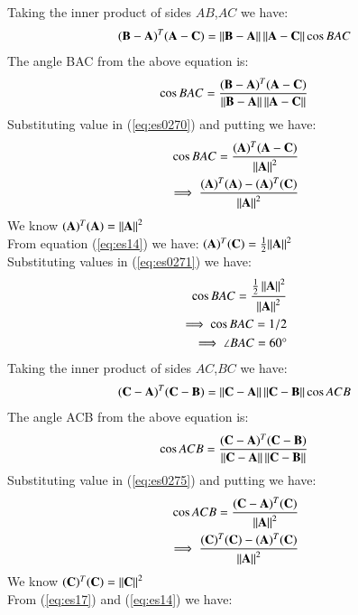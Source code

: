 \documentclass[journal,12pt,twocolumn]{IEEEtran}
\begin{document}
Taking the inner product of sides $AB$,$AC$ we have:
\begin{align}
    (\mathbf{B}-\mathbf{A})^T(\mathbf{A}-\mathbf{C}) =
    \left\lVert\mathbf{B}-\mathbf{A}\right\rVert\left\lVert\mathbf{A}-\mathbf{C}\right\rVert\cos{BAC}
\end{align}
The angle BAC from the  above equation is:
\begin{align}\label{eq:es0270}
     \cos{BAC} = \frac{(\mathbf{B}-\mathbf{A})^T(\mathbf{A}-\mathbf{C})}{\left\lVert\mathbf{B}-\mathbf{A}\right\rVert\left\lVert\mathbf{A}-\mathbf{C}\right\rVert} 
\end{align}
Substituting value in (\ref{eq:es0270}) and putting we have:
\begin{align}\label{eq:es0271}
     \cos{BAC} = \frac{(\mathbf{A})^T(\mathbf{A-C})}{\left\lVert\mathbf{A}\right\rVert^2}\\
     \implies \frac{(\mathbf{A})^T(\mathbf{A})-(\mathbf{A})^T(\mathbf{C})}{\left\lVert\mathbf{A}\right\rVert^2}
\end{align}
We know $(\mathbf{A})^T (\mathbf{A})= {\left\lVert\mathbf{A}\right\rVert^2}$\\
From  equation (\ref{eq:es14}) we have:
$ (\mathbf{A})^T(\mathbf{C})= \frac{1}{2}{\left\lVert\mathbf{A}\right\rVert^2}$\\
Substituting values in (\ref{eq:es0271}) we have:
\begin{align}\label{eq:es0272}
\cos{BAC} =
    \frac{{\frac{1}{2}\left\lVert\mathbf{A}\right\rVert^2}}{\left\lVert\mathbf{A}\right\rVert^2}\nonumber\\
     \implies \cos{BAC} = 1/2\nonumber\\
\implies \angle {BAC =60 \degree}
\end{align}
Taking the inner product of sides $AC$,$BC$ we have:
\begin{align}
    (\mathbf{C}-\mathbf{A})^T(\mathbf{C}-\mathbf{B}) =
    \left\lVert\mathbf{C}-\mathbf{A}\right\rVert\left\lVert\mathbf{C}-\mathbf{B}\right\rVert\cos{ACB}
\end{align}
The angle ACB from the  above equation is:
\begin{align}
\label{eq:es0275}
     \cos{ACB} = \frac{(\mathbf{C}-\mathbf{A})^T(\mathbf{C}-\mathbf{B})}{\left\lVert\mathbf{C}-\mathbf{A}\right\rVert\left\lVert\mathbf{C}-\mathbf{B}\right\rVert} 
\end{align}
Substituting value in (\ref{eq:es0275}) and putting we have:
\begin{align}\label{eq:es0276}
     \cos{ACB} = \frac{(\mathbf{C-A})^T(\mathbf{C})}{\left\lVert\mathbf{A}\right\rVert^2}\nonumber\\
     \implies \frac{(\mathbf{C})^T(\mathbf{C})-(\mathbf{A})^T(\mathbf{C})}{\left\lVert\mathbf{A}\right\rVert^2}
\end{align}
We know $(\mathbf{C})^T (\mathbf{C})= {\left\lVert\mathbf{C}\right\rVert^2}$\\
From   (\ref{eq:es17})  and (\ref{eq:es14})  we have:\\
\end{document}
